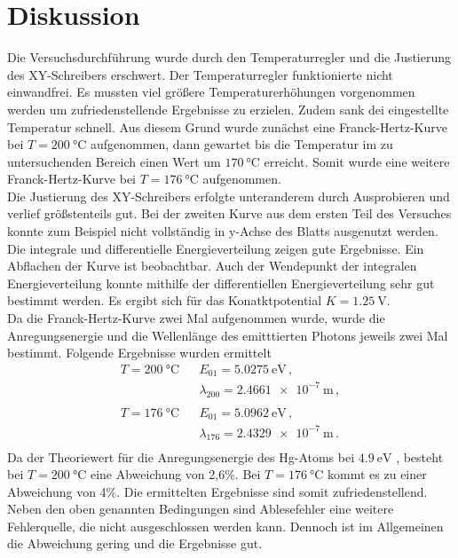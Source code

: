 \section{Diskussion}
\label{sec:Diskussion}

Die Versuchsdurchführung wurde durch den Temperaturregler und die Justierung des XY-Schreibers erschwert.
Der Temperaturregler funktionierte nicht einwandfrei.
Es mussten viel größere Temperaturerhöhungen vorgenommen werden um zufriedenstellende Ergebnisse zu erzielen.
Zudem sank dei eingestellte Temperatur schnell.
Aus diesem Grund wurde zunächst eine Franck-Hertz-Kurve bei $T = \SI{200}{\celsius}$ aufgenommen, dann gewartet bis
die Temperatur im zu untersuchenden Bereich einen Wert um $\SI{170}{\celsius}$ erreicht.
Somit wurde eine weitere Franck-Hertz-Kurve bei $T = \SI{176}{\celsius}$ aufgenommen. \\
\noindent
Die Justierung des XY-Schreibers erfolgte unteranderem durch Ausprobieren und verlief größstenteils gut.
Bei der zweiten Kurve aus dem ersten Teil des Versuches konnte zum Beispiel nicht vollständig in y-Achse des Blatts ausgenutzt werden. \\


\noindent
Die integrale und differentielle Energieverteilung zeigen gute Ergebnisse.
Ein Abflachen der Kurve ist beobachtbar.
Auch der Wendepunkt der integralen Energieverteilung konnte mithilfe der differentiellen Energieverteilung sehr gut bestimmt werden.
Es ergibt sich für das Konatktpotential $K = \SI{1.25}{\volt}$. \\


\noindent
Da die Franck-Hertz-Kurve zwei Mal aufgenommen wurde, wurde die Anregungsenergie und die Wellenlänge des emitttierten Photons jeweils 
zwei Mal bestimmt.
Folgende Ergebnisse wurden ermittelt
\begin{align*}
    T = \SI{200}{\celsius}&                  &E_{01}=\SI{5.0275}{\electronvolt} \, , \\
                          &          &\lambda_{200} = \SI{2.4661e-7}{\metre} \, , \\
                                    \\
    T = \SI{176}{\celsius}&                  &E_{01}=\SI{5.0962}{\electronvolt}  \, , \\
                          &          &\lambda_{176} = \SI{2.4329e-7}{\metre} \, . \\
\end{align*}
\noindent
Da der Theoriewert für die Anregungsenergie des Hg-Atoms bei $\SI{4.9}{\electronvolt}$ \cite{theo}, besteht bei $T = \SI{200}{\celsius}$ eine Abweichung von 2,6\%.
Bei $T = \SI{176}{\celsius}$ kommt es zu einer Abweichung von 4\%.
Die ermittelten Ergebnisse sind somit zufriedenstellend.\\
\noindent
Neben den oben genannten Bedingungen sind Ablesefehler eine weitere Fehlerquelle, die nicht ausgeschlossen werden kann.
Dennoch ist im Allgemeinen die Abweichung gering und die Ergebnisse gut.

